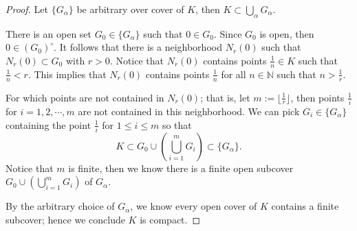 \begin{Exercise}
\begin{proof}
Let $\{G_{\alpha}\}$ be arbitrary over cover of $K$, then $K\subset \bigcup_{\alpha}G_{\alpha}$.

There is an open set $G_0 \in \{G_{\alpha}\}$ such that $0\in G_0$. Since $G_0$ is open, then $0\in (G_0)^{\circ}$. It follows that there is a neighborhood $N_r(0)$ such that $N_r(0)\subset G_0$ with $r>0$. Notice that $N_r(0)$ contains points $\frac{1}{n}\in K$ such that $\frac{1}{n}<r$. This implies that $N_r(0)$ contains points $\frac{1}{n}$ for all $n\in\mathbb{N}$ such that $n>\frac{1}{r}$.

For which points are not contained in $N_r(0)$; that is, let $m := \lfloor \frac{1}{r} \rfloor$, then points $\frac{1}{i}$ for $i=1,2,\cdots,m$ are not contained in this neighborhood. We can pick $G_i\in \{G_{\alpha}\}$ containing the point $\frac{1}{i}$ for $1\leq i \leq m$ so that
$$
K\subset G_0\cup \left( \bigcup_{i=1}^{m}G_i \right) \subset \{G_{\alpha}\}.
$$
Notice that $m$ is finite, then we know there is a finite open subcover $G_0\cup \left( \bigcup_{i=1}^{m}G_i \right)$ of $G_{\alpha}$.

By the arbitrary choice of $G_{\alpha}$, we know every open cover of $K$ contains a finite subcover; hence we conclude $K$ is compact.
\end{proof}
\end{Exercise}